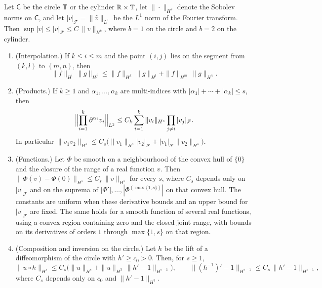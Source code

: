 \begin{lemma}\label{lem:one-high-factor}
Let $\mathsf C$ be the circle $\mathbb T$ or the cylinder $\mathbb R\times\mathbb T$, let
$\|\cdot\|_{H^s}$ denote the Sobolev norms on $\mathsf C$, and let
$|v|_{\mathcal F}=\|\widehat v\|_{L^1}$ be the $L^1$ norm of the
Fourier transform. Then
$\sup|v|\le|v|_{\mathcal F}\le C\,\|v\|_{H^b}$, where $b=1$ on the
circle and $b=2$ on the cylinder.
\begin{enumerate}
\item \textup{(Interpolation.)} If $k\le i\le m$ and the point $(i,j)$
 lies on the segment from $(k,l)$ to $(m,n)$, then
 \[
  \|f\|_{H^i}\,\|g\|_{H^j}
  \le\|f\|_{H^k}\,\|g\|_{H^l}+\|f\|_{H^m}\,\|g\|_{H^n}.
 \]
\item \textup{(Products.)} If $k\ge1$ and $\alpha_1,\ldots,\alpha_k$ are
 multi-indices with $|\alpha_1|+\cdots+|\alpha_k|\le s$, then
 \[
  \Bigl\|\prod_{i=1}^k\partial^{\alpha_i}v_i\Bigr\|_{L^2}
  \le C_k\sum_{i=1}^k\|v_i\|_{H^s}\prod_{j\ne i}|v_j|_{\mathcal F}.
 \]
 In particular
 $\|v_1v_2\|_{H^s}\le C_s\bigl(\|v_1\|_{H^s}|v_2|_{\mathcal F}
 +|v_1|_{\mathcal F}\|v_2\|_{H^s}\bigr)$.
\item \textup{(Functions.)} Let $\Phi$ be smooth on a neighbourhood of
 the convex hull of $\{0\}$ and the closure of the range of a real
 function $v$. Then
 $\|\Phi(v)-\Phi(0)\|_{H^s}\le C_s\,\|v\|_{H^s}$ for every $s$,
 where $C_s$ depends only on $|v|_{\mathcal F}$ and on the suprema of
 $|\Phi'|,\ldots,|\Phi^{(\max\{1,s\})}|$ on that convex hull.
 The constants are uniform when these derivative bounds and an upper bound
 for $|v|_{\mathcal F}$ are fixed. The same holds for a smooth function
 of several real functions, using a convex region containing zero and the
 closed joint range, with bounds on its derivatives of orders $1$ through
 $\max\{1,s\}$ on that region.
\item \textup{(Composition and inversion on the circle.)} Let $h$ be
 the lift of a diffeomorphism of the circle with $h'\ge c_0>0$. Then,
 for $s\ge1$,
 \[
  \|u\circ h\|_{H^s}
  \le C_s\bigl(\|u\|_{H^s}+\|u\|_{H^3}\,\|h'-1\|_{H^{s-1}}\bigr),
  \qquad
  \|(h^{-1})'-1\|_{H^{s-1}}\le C_s\,\|h'-1\|_{H^{s-1}},
 \]
 where $C_s$ depends only on $c_0$ and $\|h'-1\|_{H^3}$.
\end{enumerate}
\end{lemma}

